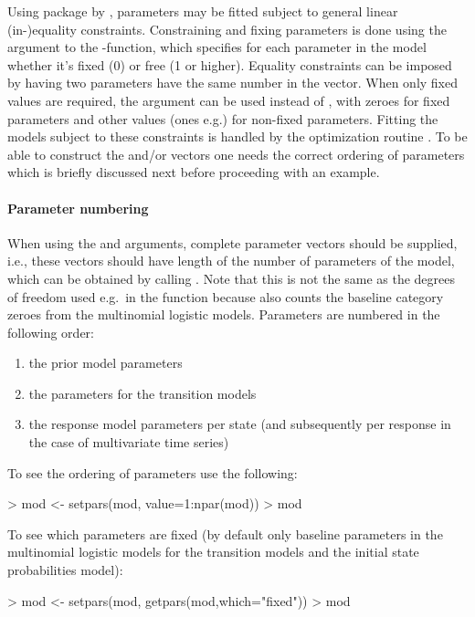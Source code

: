 \documentclass[article]{jss}
\begin{document}
Using package  by \citet{Tamura2009}, parameters may be fitted subject to
general linear (in-)equality constraints.  Constraining and fixing
parameters is done using the  argument to the
-function, which specifies for each parameter in the
model whether it's fixed (0) or free (1 or higher).  Equality
constraints can be imposed by having two parameters have the same
number in the  vector.  When only fixed values are
required, the  argument can be used instead of
, with zeroes for fixed parameters and other values (ones
e.g.) for non-fixed parameters.  Fitting the models subject to these
constraints is handled by the optimization routine .
To be able to construct the  and/or  vectors 
one needs the correct ordering of parameters which is briefly discussed 
next before proceeding with an example. 

\paragraph{Parameter numbering} When using the  and
 arguments, complete parameter vectors should be supplied,
i.e., these vectors should have length of the number of parameters of
the model, which can be obtained by calling . Note that
this is not the same as the degrees of freedom used e.g.\ in the 
function because  also counts the baseline category zeroes
from the multinomial logistic models. 
Parameters are numbered in the following order:
\begin{enumerate}
	\item  the prior model parameters
	\item  the parameters for the transition models
	\item  the response model parameters per state (and subsequently
	per response in the case of multivariate time series)
\end{enumerate}

To see the ordering of parameters use the following:
\begin{CodeChunk}
\begin{CodeInput}
> mod <- setpars(mod, value=1:npar(mod))
> mod
\end{CodeInput}
\end{CodeChunk}

To see which parameters are fixed (by default only baseline parameters
in the multinomial logistic models for the transition models and the
initial state probabilities model):
\begin{CodeChunk}
\begin{CodeInput}
> mod <- setpars(mod, getpars(mod,which="fixed"))
> mod
\end{CodeInput}
\end{CodeChunk}
\end{document}
